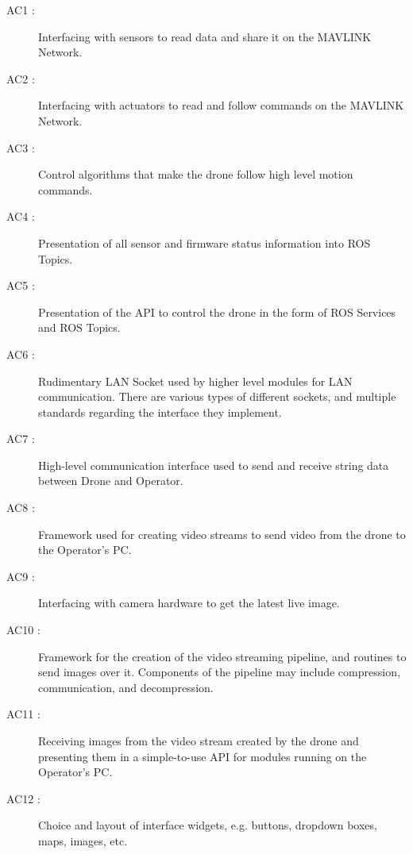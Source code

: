 \documentclass[12pt, titlepage]{article}
\begin{document}
\begin{description}
\item[AC1 \label{AC_Ardupilot1}:] Interfacing with sensors to read data and share it on the MAVLINK Network.

\item[AC2 \label{AC_Ardupilot2}:] Interfacing with actuators to read and follow commands on the MAVLINK Network. 

\item[AC3 \label{AC_Ardupilot3}:] 
Control algorithms that make the drone follow high level motion commands. 

\item[AC4 \label{AC_MavROS1}:] 
Presentation of all sensor and firmware status information into ROS Topics.  

\item[AC5 \label{AC_MavROS2}:] 
Presentation of the API to control the drone in the form of ROS Services and ROS Topics.  

\item[AC6 \label{AC_BaseSocket1}:] 
Rudimentary LAN Socket used by higher level modules for LAN communication. There are various types of different sockets, and multiple standards regarding the interface they implement.

\item[AC7 \label{AC_MessageSocket1}:] 
High-level communication interface used to send and receive string data between Drone and Operator. 

\item[AC8 \label{AC_GStreamer1}:] 
Framework used for creating video streams to send video from the drone to the Operator's PC. 

\item[AC9 \label{AC_DroneCamera1}:] 
Interfacing with camera hardware to get the latest live image.

\item[AC10 \label{AC_DroneCamera2}:] 
Framework for the creation of the video streaming pipeline, and routines to send images over it. Components of the pipeline may include compression, communication, and decompression.

\item[AC11 \label{AC_OperatorCamera1}:] 
Receiving images from the video stream created by the drone and presenting them in a simple-to-use API for modules running on the Operator's PC. 

\item[AC12 \label{AC_UserInterface1}:] 
Choice and layout of interface widgets, e.g. buttons, dropdown boxes, maps, images, etc.


\end{description}
\end{document}
